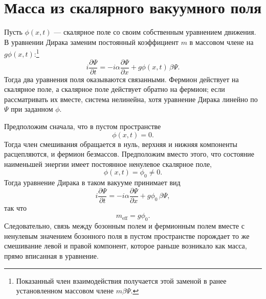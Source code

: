 \begin{classroomqa}
\end{classroomqa}

\section{Масса из скалярного вакуумного поля}

\begin{classroomqa}
\end{classroomqa}

Пусть \(\phi(x,t)\) — скалярное поле со своим собственным уравнением движения. В уравнении Дирака заменим постоянный коэффициент \(m\) в массовом члене на \(g\phi(x,t)\):\footnote{Показанный член взаимодействия получается этой заменой в ранее установленном массовом члене \(m\beta\Psi\).}
\begin{equation}
i\frac{\partial\Psi}{\partial t}
=
-i\alpha\frac{\partial\Psi}{\partial x}
+g\phi(x,t)\,\beta\Psi.
\end{equation}
Тогда два уравнения поля оказываются связанными. Фермион действует на скалярное поле, а скалярное поле действует обратно на фермион; если рассматривать их вместе, система нелинейна, хотя уравнение Дирака линейно по \(\Psi\) при заданном \(\phi\).

Предположим сначала, что в пустом пространстве
\begin{equation}
\phi(x,t)=0.
\end{equation}
Тогда член смешивания обращается в нуль, верхняя и нижняя компоненты расцепляются, и фермион безмассов. Предположим вместо этого, что состояние наименьшей энергии имеет постоянное ненулевое скалярное поле,
\begin{equation}
\phi(x,t)=\phi_0\neq0.
\end{equation}
Тогда уравнение Дирака в таком вакууме принимает вид
\begin{equation}
i\frac{\partial\Psi}{\partial t}
=
-i\alpha\frac{\partial\Psi}{\partial x}
+g\phi_0\,\beta\Psi,
\end{equation}
так что
\begin{equation}
m_{\mathrm{eff}}=g\phi_0.
\end{equation}
Следовательно, связь между бозонным полем и фермионным полем вместе с ненулевым значением бозонного поля в пустом пространстве порождает то же смешивание левой и правой компонент, которое раньше возникало как масса, прямо вписанная в уравнение.

